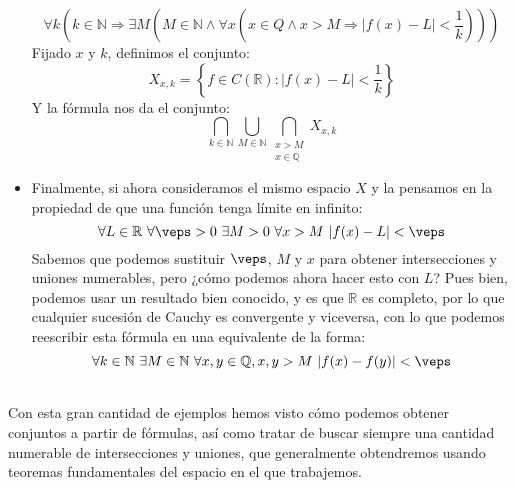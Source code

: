 \begin{ejemplo}
\begin{itemize}
            \begin{equation*}
                \forall k\left(k\in \mathbb{N}\Longrightarrow \exists M\left(M\in \mathbb{N}\land \forall x\left(x\in Q\land x>M \Longrightarrow |f(x)-L|<\dfrac{1}{k}\right)\right)\right)
            \end{equation*}
            Fijado $x$ y $k$, definimos el conjunto:
            \begin{equation*}
                X_{x,k} = \left\{f\in C(\mathbb{R}) : |f(x)-L|<\dfrac{1}{k}\right\}
            \end{equation*}
            Y la fórmula nos da el conjunto:
            \begin{equation*}
                \bigcap_{k\in \mathbb{N}} \bigcup_{M\in \mathbb{N}} \bigcap_{\substack{x>M\\x\in \mathbb{Q}}} X_{x,k}
            \end{equation*}
        \item Finalmente, si ahora consideramos el mismo espacio $X$ y la pensamos en la propiedad de que una función tenga límite en infinito:
            \begin{equation*}
                \forall L\in \mathbb{R}\ \forall \veps > 0\ \exists M>0\ \forall x>M\ |f(x)-L|<\veps
            \end{equation*}
            Sabemos que podemos sustituir $\veps$, $M$ y $x$ para obtener intersecciones y uniones numerables, pero ¿cómo podemos ahora hacer esto con $L$? Pues bien, podemos usar un resultado bien conocido, y es que $\mathbb{R}$ es completo, por lo que cualquier sucesión de Cauchy es convergente y viceversa, con lo que podemos reescribir esta fórmula en una equivalente de la forma:
            \begin{equation*}
                \forall k\in \mathbb{N}\ \exists M\in \mathbb{N}\ \forall x,y\in \mathbb{Q}, x,y>M\ |f(x)-f(y)|<\veps
            \end{equation*}
    \end{itemize}
\end{ejemplo}~\\
\noindent
Con esta gran cantidad de ejemplos hemos visto cómo podemos obtener conjuntos a partir de fórmulas, así como tratar de buscar siempre una cantidad numerable de intersecciones y uniones, que generalmente obtendremos usando teoremas fundamentales del espacio en el que trabajemos.\\

